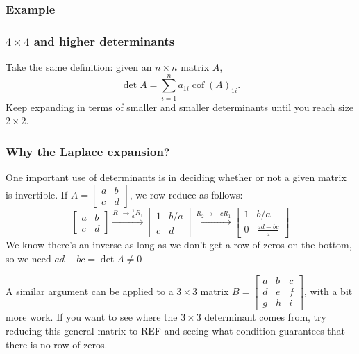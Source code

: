 \documentclass[11pt,t]{beamer}
\DeclareMathOperator{\cof}{cof}
\begin{document}
\begin{frame}
\frametitle{Example}

\end{frame}
\begin{frame}
\frametitle{$4\times 4$ and higher determinants}
Take the same definition: given an $n\times n$ matrix $A$,
\[
\det A = \sum_{i=1}^n a_{1i}\cof(A)_{1i}.
\]
Keep expanding in terms of smaller and smaller determinants until you reach size $2\times 2$.
\end{frame}
\begin{frame}\frametitle{Why the Laplace expansion?}
 One important use of determinants is in deciding whether or not a given matrix is invertible. If $A=\begin{bmatrix}a&b\\c&d\end{bmatrix}$, we row-reduce as follows:
\[
 \begin{bmatrix}a&b\\c&d\end{bmatrix}\xrightarrow[]{R_1\to \frac{1}{a}R_1} \begin{bmatrix}1&b/a\\c&d\end{bmatrix}\xrightarrow[]{R_2\to -cR_1} \begin{bmatrix}1&b/a\\0&\frac{ad-bc}{a}\end{bmatrix}
\]
We know there's an inverse as long as we don't get a row of zeros on the bottom, so we need $ad-bc=\det A\neq 0$

 A similar argument can be applied to a $3\times 3$ matrix $B=\begin{bmatrix}a&b&c\\d&e&f\\g&h&i\end{bmatrix}$, with a bit more work. If you want to see where the $3\times 3$ determinant comes from, try reducing this general matrix to REF and seeing what condition guarantees that there is no row of zeros.
\end{frame}
\end{document}
